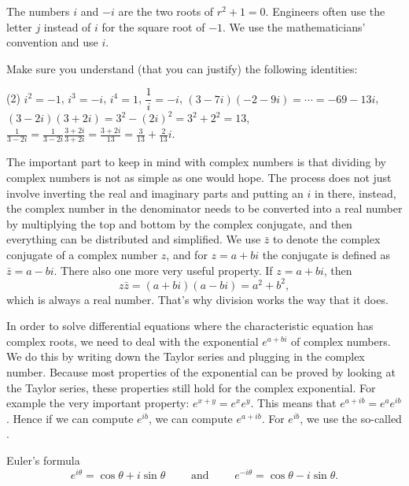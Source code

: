 The numbers
$i$ and $-i$ are the two roots of $r^2 + 1 = 0$.
Engineers often use the letter $j$ instead of $i$ for the square
root of $-1$.  We use the mathematicians' convention and use $i$.

\begin{exercise}
Make sure you understand (that you can justify)
the following identities:
\begin{tasks}(2)
\task $i^2 = -1$, $i^3 = -i$, $i^4 = 1$,
\task $\dfrac{1}{i} = -i$,
\task $(3-7i)(-2-9i) = \cdots = -69-13i$,
\task $(3-2i)(3+2i) = 3^2 - {(2i)}^2 = 3^2 + 2^2 = 13$,
\task $\frac{1}{3-2i} = \frac{1}{3-2i} \frac{3+2i}{3+2i} = \frac{3+2i}{13}
= \frac{3}{13}+\frac{2}{13}i$.
\end{tasks}
\end{exercise}

The important part to keep in mind with complex numbers is that dividing by complex numbers is not as simple as one would hope. The process does not just involve inverting the real and imaginary parts and putting an $i$ in there, instead, the complex number in the denominator needs to be converted into a real number by multiplying the top and bottom by the complex conjugate, and then everything can be distributed and simplified. We use $\bar{z}$ to denote the complex conjugate of a complex number $z$, and for $z = a+bi$ the conjugate is defined as $\bar{z} = a - bi$. There also one more very useful property. If $z = a+bi$, then \[ z\bar{z} = (a+bi)(a-bi) = a^2 + b^2, \] which is always a real number. That's why division works the way that it does.

\pagebreak[2]
In order to solve differential equations where the characteristic equation has complex roots, we need to deal with the exponential $e^{a+bi}$ of complex numbers. 
We do this by writing down the Taylor series and plugging in the complex
number.  Because most properties of the exponential can be proved by looking
at the Taylor series, these
properties still hold for the complex
exponential.  For example the very important property: $e^{x+y} = e^x e^y$.  This means that
$e^{a+ib} = e^a e^{ib}$.  Hence if we can compute $e^{ib}$, we can
compute $e^{a+ib}$.  For $e^{ib}$, we use the so-called
\emph{}.

\begin{theorem1}[eulersformula]{Euler's formula} 
\begin{equation*}
e^{i \theta} = \cos \theta + i \sin \theta
\qquad \text{ and } \qquad
e^{- i \theta} = \cos \theta - i \sin \theta .
\end{equation*}
\end{theorem1}

